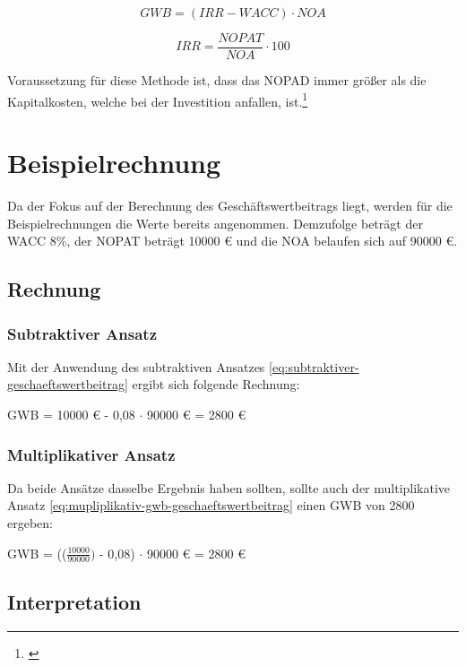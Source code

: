 \begin{equation}
    GWB = (IRR - WACC) \cdot NOA
    \label{eq:mupliplikativ-gwb-geschaeftswertbeitrag}
\end{equation}

\begin{equation}
    IRR = \frac{NOPAT}{NOA} \cdot 100
    \label{eq:mupliplikativ-irr-geschaeftswertbeitrag}
\end{equation}

\bigskip

\noindent
Voraussetzung für diese Methode ist, dass das NOPAD immer größer als die Kapitalkosten, welche bei der Investition anfallen, ist.\footnote{\cite{bwllexicon-eva}}

\section{Beispielrechnung}

Da der Fokus auf der Berechnung des Geschäftswertbeitrags liegt, werden für die Beispielrechnungen die Werte bereits angenommen. Demzufolge beträgt der WACC 8\%, der NOPAT beträgt 10000 € und die NOA belaufen sich auf 90000 €.

\subsection{Rechnung}

\subsubsection{Subtraktiver Ansatz}

Mit der Anwendung des subtraktiven Ansatzes \eqref{eq:subtraktiver-geschaeftswertbeitrag} ergibt sich folgende Rechnung:

\bigskip
GWB = 10000 € - 0,08 $\cdot$ 90000 € = 2800 €


\subsubsection{Multiplikativer Ansatz}

Da beide Ansätze dasselbe Ergebnis haben sollten, sollte auch der multiplikative Ansatz \eqref{eq:mupliplikativ-gwb-geschaeftswertbeitrag} einen GWB von 2800 ergeben:

\bigskip
GWB = (($\frac{10000}{90000})$ - 0,08) $\cdot$ 90000 € = 2800 €

\subsection{Interpretation}

